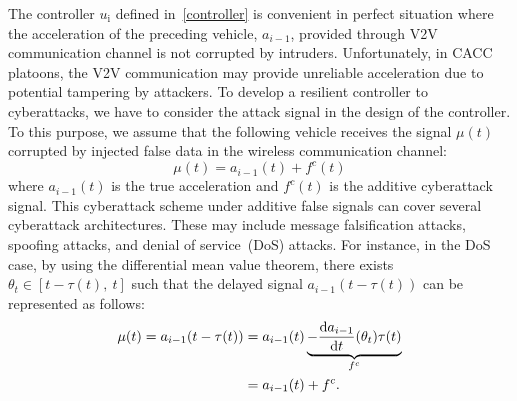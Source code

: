 {The controller $u_{\text{i}}$ defined in~\eqref{controller} is convenient in perfect situation where the acceleration of the preceding vehicle, $a_{i-1}$, provided through V2V communication channel is not corrupted by intruders. Unfortunately, in CACC platoons, the V2V communication may provide unreliable acceleration due to potential tampering by attackers. %
%
%
To develop a resilient controller to cyberattacks, we have to consider the attack signal in the design of the controller. To this purpose, we assume that the following vehicle receives the signal $\mu(t)$  corrupted by injected false data in the wireless communication channel:
\begin{equation}\label{ali_e1}
\mu(t) = a_{i-1}(t) + f^c(t)
\end{equation}
where $a_{i-1}(t)$ is the true acceleration and $f^c(t)$ is the additive cyberattack signal. This cyberattack scheme under additive false signals can cover several cyberattack architectures. These may include message falsification attacks, spoofing attacks, and denial of service~(DoS) attacks. For instance, in the DoS case, by using the differential mean value theorem, there exists $\theta_t \in [t-\tau(t),~ t]$ such that the delayed signal $a_{i-1}(t-\tau(t))$ can be represented as follows:
\begin{align}\label{ali_e2}
 \mu(t) = a_{i-1}(t-\tau(t)) &= a_{i-1}(t) \underbrace{- \frac{{\rm d}a_{i-1}}{{\rm d}t}(\theta_t) \tau(t)}_{f^c} \notag \\
 &= a_{i-1}(t) + f^c.
\end{align}



}
